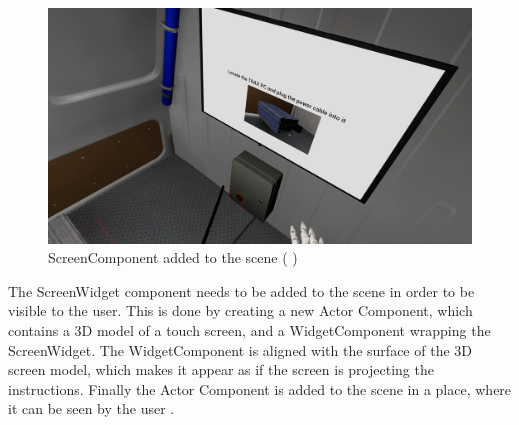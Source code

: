 \documentclass[12pt, a4paper,oneside, nocenter]{thesis}
\renewcommand{\citeyearpar}[1]{(\citeauthor{#1} \citeyear{#1})}
\begin{document}
\begin{figure}[H]
	\includegraphics[width=\textwidth]{screen-component}
	\caption{ScreenComponent added to the scene \citeyearpar{obsas-assets}}
	\label{fig:screen-component}
\end{figure}
\par
The ScreenWidget component needs to be added to the scene in order to be visible to the user. This is done by creating a new Actor Component, which contains a 3D model of a touch screen, and a WidgetComponent wrapping the ScreenWidget. The WidgetComponent is aligned with the surface of the 3D screen model, which makes it appear as if the screen is projecting the instructions. Finally the Actor Component is added to the scene in a place, where it can be seen by the user .
\end{document}
